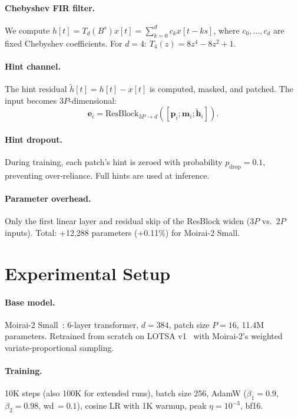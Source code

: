 \documentclass[letterpaper]{article}
\begin{document}
\paragraph{Chebyshev FIR filter.} We compute $h[t] = T_d(B^s) x[t] = \sum_{k=0}^{d} c_k x[t - ks]$, where $c_0, \ldots, c_d$ are fixed Chebyshev coefficients. For $d{=}4$: $T_4(z) = 8z^4 - 8z^2 + 1$.

\paragraph{Hint channel.} The hint residual $\tilde{h}[t] = h[t] - x[t]$ is computed, masked, and patched. The input becomes $3P$-dimensional:
\begin{equation}
\mathbf{e}_i = \text{ResBlock}_{3P \to d}([\mathbf{p}_i; \mathbf{m}_i; \tilde{\mathbf{h}}_i]).
\end{equation}

\paragraph{Hint dropout.} During training, each patch's hint is zeroed with probability $p_{\text{drop}}{=}0.1$, preventing over-reliance. Full hints are used at inference.

\paragraph{Parameter overhead.} Only the first linear layer and residual skip of the ResBlock widen ($3P$ vs.\ $2P$ inputs). Total: +12,288 parameters (+0.11\%) for Moirai-2 Small.

\section{Experimental Setup}

\paragraph{Base model.} Moirai-2 Small~\citep{liu2024moirai2}: 6-layer transformer, $d{=}384$, patch size $P{=}16$, 11.4M parameters. Retrained from scratch on LOTSA v1~\citep{woo2024unified} with Moirai-2's weighted variate-proportional sampling.

\paragraph{Training.} 10K steps (also 100K for extended runs), batch size 256, AdamW ($\beta_1{=}0.9$, $\beta_2{=}0.98$, wd$\,{=}0.1$), cosine LR with 1K warmup, peak $\eta{=}10^{-3}$, bf16.
\end{document}
